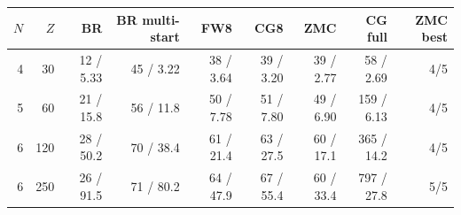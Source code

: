 \begin{tabular}{rrrrrrrrr}
\toprule
$N$ & $Z$ & BR & BR multi-start & FW8 & CG8 & ZMC & CG full & ZMC best \\
\midrule
4 & 30 & 12 / 5.33 & 45 / 3.22 & 38 / 3.64 & 39 / 3.20 & 39 / 2.77 & 58 / 2.69 & 4/5 \\
5 & 60 & 21 / 15.8 & 56 / 11.8 & 50 / 7.78 & 51 / 7.80 & 49 / 6.90 & 159 / 6.13 & 4/5 \\
6 & 120 & 28 / 50.2 & 70 / 38.4 & 61 / 21.4 & 63 / 27.5 & 60 / 17.1 & 365 / 14.2 & 4/5 \\
6 & 250 & 26 / 91.5 & 71 / 80.2 & 64 / 47.9 & 67 / 55.4 & 60 / 33.4 & 797 / 27.8 & 5/5 \\
\bottomrule
\end{tabular}

